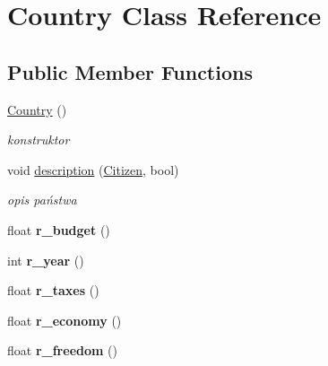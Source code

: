 \hypertarget{classCountry}{\section{Country Class Reference}
\label{classCountry}
}
\subsection*{Public Member Functions}
\begin{DoxyCompactItemize}
\item 
\hypertarget{classCountry_a4cba457856775a13a17dfcb11a77e224}{\hyperlink{classCountry_a4cba457856775a13a17dfcb11a77e224}{Country} ()}\label{classCountry_a4cba457856775a13a17dfcb11a77e224}

\begin{DoxyCompactList}\small\item\em konstruktor \end{DoxyCompactList}\item 
\hypertarget{classCountry_a1ee1ad4bc8ad02c5d7984fbbbec9e59a}{void \hyperlink{classCountry_a1ee1ad4bc8ad02c5d7984fbbbec9e59a}{description} (\hyperlink{classCitizen}{Citizen}, bool)}\label{classCountry_a1ee1ad4bc8ad02c5d7984fbbbec9e59a}

\begin{DoxyCompactList}\small\item\em opis państwa \end{DoxyCompactList}\item 
\hypertarget{classCountry_ae2e40771e1bff236aad7dd42b73b146c}{float {\bfseries r\+\_\+budget} ()}\label{classCountry_ae2e40771e1bff236aad7dd42b73b146c}

\item 
\hypertarget{classCountry_a48b49c96e2382142f72d8f94b020444c}{int {\bfseries r\+\_\+year} ()}\label{classCountry_a48b49c96e2382142f72d8f94b020444c}

\item 
\hypertarget{classCountry_a16186c9516ff8bf5f89453dc382f16c6}{float {\bfseries r\+\_\+taxes} ()}\label{classCountry_a16186c9516ff8bf5f89453dc382f16c6}

\item 
\hypertarget{classCountry_ae8c196516f9b25ad5ad3a473a39dbbc4}{float {\bfseries r\+\_\+economy} ()}\label{classCountry_ae8c196516f9b25ad5ad3a473a39dbbc4}

\item 
\hypertarget{classCountry_a79e830cfbca91ab9cf3b470a59686a5c}{float {\bfseries r\+\_\+freedom} ()}\label{classCountry_a79e830cfbca91ab9cf3b470a59686a5c}


\end{DoxyCompactItemize}
